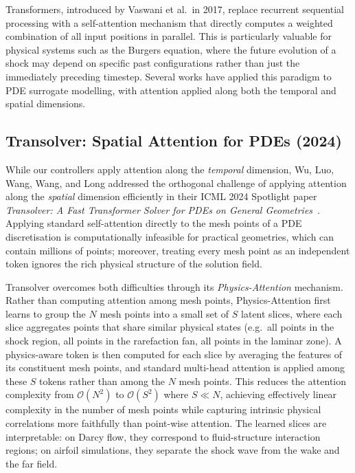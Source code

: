 Transformers, introduced by Vaswani et al.\ in 2017, replace recurrent sequential processing with a self-attention mechanism that directly computes a weighted combination of all input positions in parallel. This is particularly valuable for physical systems such as the Burgers equation, where the future evolution of a shock may depend on specific past configurations rather than just the immediately preceding timestep. Several works have applied this paradigm to PDE surrogate modelling, with attention applied along both the temporal and spatial dimensions.

\subsection{Transolver: Spatial Attention for PDEs (2024)}
\label{sec:bg:transolver}

While our controllers apply attention along the \emph{temporal} dimension, Wu, Luo, Wang, Wang, and Long addressed the orthogonal challenge of applying attention along the \emph{spatial} dimension efficiently in their ICML 2024 Spotlight paper \emph{Transolver: A Fast Transformer Solver for PDEs on General Geometries}~\cite{wu2024transolver}. Applying standard self-attention directly to the mesh points of a PDE discretisation is computationally infeasible for practical geometries, which can contain millions of points; moreover, treating every mesh point as an independent token ignores the rich physical structure of the solution field.

Transolver overcomes both difficulties through its \emph{Physics-Attention} mechanism. Rather than computing attention among mesh points, Physics-Attention first learns to group the $N$ mesh points into a small set of $S$ latent slices, where each slice aggregates points that share similar physical states (e.g.\ all points in the shock region, all points in the rarefaction fan, all points in the laminar zone). A physics-aware token is then computed for each slice by averaging the features of its constituent mesh points, and standard multi-head attention is applied among these $S$ tokens rather than among the $N$ mesh points. This reduces the attention complexity from $\mathcal{O}(N^2)$ to $\mathcal{O}(S^2)$ where $S \ll N$, achieving effectively linear complexity in the number of mesh points while capturing intrinsic physical correlations more faithfully than point-wise attention. The learned slices are interpretable: on Darcy flow, they correspond to fluid-structure interaction regions; on airfoil simulations, they separate the shock wave from the wake and the far field.


